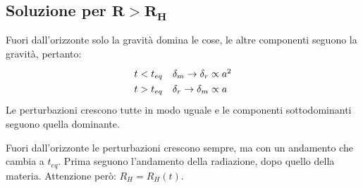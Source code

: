 \subsection{Soluzione per $\mathbf{R > R_H}$}
Fuori dall'orizzonte solo la gravità domina le cose, le altre componenti seguono la gravità, pertanto:
\begin{equation}
    \def\arraystretch{1.3}
        \begin{array}{ll}
            t<t_{eq} & \delta_m \to  \delta_r \propto a^2  \\
            t>t_{eq} & \delta_r \to \delta_m \propto a  
    \end{array} \label{none}
\end{equation}
Le perturbazioni crescono tutte in modo uguale e le componenti sottodominanti seguono quella dominante.

\begin{theorem}
Fuori dall'orizzonte le perturbazioni crescono sempre, ma con un andamento che cambia a $t_{eq}$. Prima seguono l'andamento della radiazione, dopo quello della materia. Attenzione però: $R_H=R_H(t)$.
\end{theorem}


